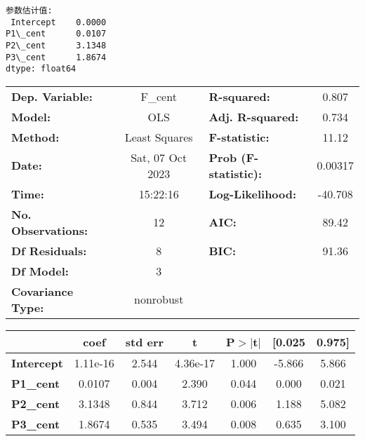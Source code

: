 \documentclass[11pt]{article}
\newcommand{\prompt}[4]{
        {\ttfamily\llap{{\color{#2}[#3]:\hspace{3pt}#4}}\vspace{-\baselineskip}}
    }
\begin{document}
    \begin{Verbatim}[commandchars=\\\{\}]
参数估计值:
 Intercept    0.0000
P1\_cent      0.0107
P2\_cent      3.1348
P3\_cent      1.8674
dtype: float64
    \end{Verbatim}
 
            
\prompt{Out}{outcolor}{87}{}
    
    \begin{center}
\begin{tabular}{lclc}
\toprule
\textbf{Dep. Variable:}    &     F\_cent      & \textbf{  R-squared:         } &     0.807   \\
\textbf{Model:}            &       OLS        & \textbf{  Adj. R-squared:    } &     0.734   \\
\textbf{Method:}           &  Least Squares   & \textbf{  F-statistic:       } &     11.12   \\
\textbf{Date:}             & Sat, 07 Oct 2023 & \textbf{  Prob (F-statistic):} &  0.00317    \\
\textbf{Time:}             &     15:22:16     & \textbf{  Log-Likelihood:    } &   -40.708   \\
\textbf{No. Observations:} &          12      & \textbf{  AIC:               } &     89.42   \\
\textbf{Df Residuals:}     &           8      & \textbf{  BIC:               } &     91.36   \\
\textbf{Df Model:}         &           3      & \textbf{                     } &             \\
\textbf{Covariance Type:}  &    nonrobust     & \textbf{                     } &             \\
\bottomrule
\end{tabular}
\begin{tabular}{lcccccc}
                   & \textbf{coef} & \textbf{std err} & \textbf{t} & \textbf{P$> |$t$|$} & \textbf{[0.025} & \textbf{0.975]}  \\
\midrule
\textbf{Intercept} &     1.11e-16  &        2.544     &  4.36e-17  &         1.000        &       -5.866    &        5.866     \\
\textbf{P1\_cent}  &       0.0107  &        0.004     &     2.390  &         0.044        &        0.000    &        0.021     \\
\textbf{P2\_cent}  &       3.1348  &        0.844     &     3.712  &         0.006        &        1.188    &        5.082     \\
\textbf{P3\_cent}  &       1.8674  &        0.535     &     3.494  &         0.008        &        0.635    &        3.100     \\

\end{tabular}
\end{center}
\end{document}

